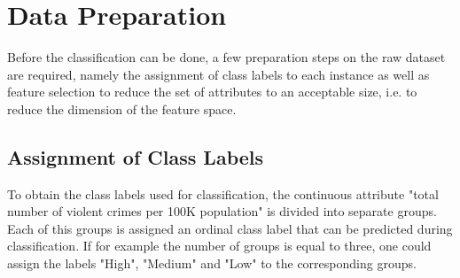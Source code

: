 \section{Data Preparation}

Before the classification can be done, a few preparation steps on the raw dataset
are required, namely the assignment of class labels to each instance as
well as feature selection to reduce the set of attributes to an
acceptable size, i.e. to reduce the dimension of the feature space.

\subsection{Assignment of Class Labels}
\label{sec:assignment}

To obtain the class labels used for classification, the
continuous attribute "total number of violent crimes per 100K
population" is divided into separate groups. Each of this groups is
assigned an ordinal class label that can be predicted during classification.
If for example the number of groups is equal to three, one could
assign the labels "High", "Medium" and "Low" to the corresponding
groups.

